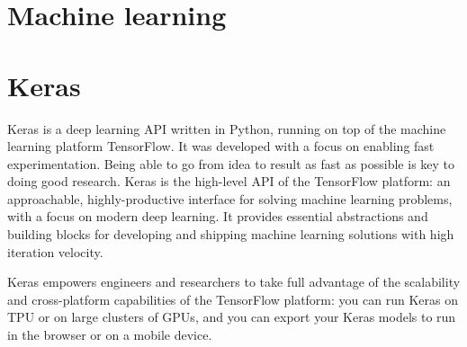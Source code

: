 \documentclass[]{article}
\title{}
\author{}
\begin{document}
	
	\maketitle
	
	\begin{abstract}
		
	\end{abstract}
	
	\section{Machine learning}
	
	\section{Keras}
	Keras is a deep learning API written in Python, running on top of the machine learning platform TensorFlow. It was developed with a focus on enabling fast experimentation. Being able to go from idea to result as fast as possible is key to doing good research.
	Keras is the high-level API of the TensorFlow platform: an approachable, highly-productive interface for solving machine learning problems, with a focus on modern deep learning. It provides essential abstractions and building blocks for developing and shipping machine learning solutions with high iteration velocity.
	
	Keras empowers engineers and researchers to take full advantage of the scalability and cross-platform capabilities of the TensorFlow platform: you can run Keras on TPU or on large clusters of GPUs, and you can export your Keras models to run in the browser or on a mobile device.
	
\end{document}
